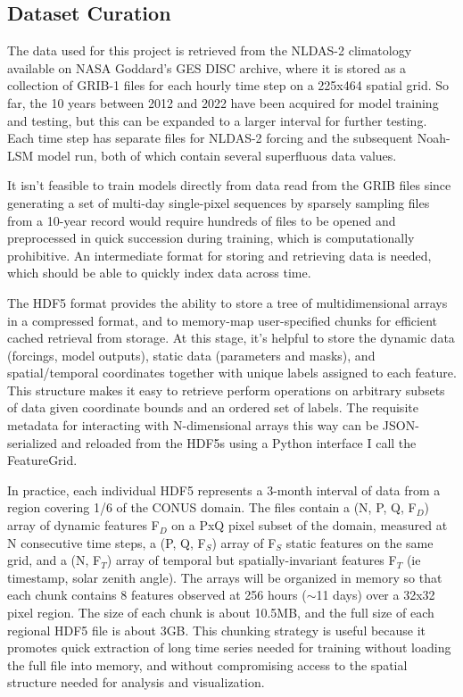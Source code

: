 \documentclass[11pt]{article}
\begin{document}
\begin{multicols}{2}

\subsection{Dataset Curation}

    The data used for this project is retrieved from the NLDAS-2 climatology available on NASA Goddard's GES DISC archive, where it is stored as a collection of GRIB-1 files for each hourly time step on a 225x464 spatial grid. So far, the 10 years between 2012 and 2022 have been acquired for model training and testing, but this can be expanded to a larger interval for further testing. Each time step has separate files for NLDAS-2 forcing and the subsequent Noah-LSM model run, both of which contain several superfluous data values.

    It isn't feasible to train models directly from data read from the GRIB files since generating a set of multi-day single-pixel sequences by sparsely sampling files from a 10-year record would require hundreds of files to be opened and preprocessed in quick succession during training, which is computationally prohibitive. An intermediate format for storing and retrieving data is needed, which should be able to quickly index data across time.

    The HDF5 format provides the ability to store a tree of multidimensional arrays in a compressed format, and to memory-map user-specified chunks for efficient cached retrieval from storage. At this stage, it's helpful to store the dynamic data (forcings, model outputs), static data (parameters and masks), and spatial/temporal coordinates together with unique labels assigned to each feature. This structure makes it easy to retrieve perform operations on arbitrary subsets of data given coordinate bounds and an ordered set of labels. The requisite metadata for interacting with N-dimensional arrays this way can be JSON-serialized and reloaded from the HDF5s using a Python interface I call the FeatureGrid.

    In practice, each individual HDF5 represents a 3-month interval of data from a region covering 1/6 of the CONUS domain. The files contain a (N, P, Q, F$_D$) array of dynamic features F$_D$ on a PxQ pixel subset of the domain, measured at N consecutive time steps, a (P, Q, F$_S$) array of F$_S$ static features on the same grid, and a (N, F$_T$) array of temporal but spatially-invariant features F$_T$ (ie timestamp, solar zenith angle). The arrays will be organized in memory so that each chunk contains 8 features observed at 256 hours ($\sim$11 days) over a 32x32 pixel region. The size of each chunk is about 10.5MB, and the full size of each regional HDF5 file is about 3GB. This chunking strategy is useful because it promotes quick extraction of long time series needed for training without loading the full file into memory, and without compromising access to the spatial structure needed for analysis and visualization.


\end{multicols}
\end{document}

